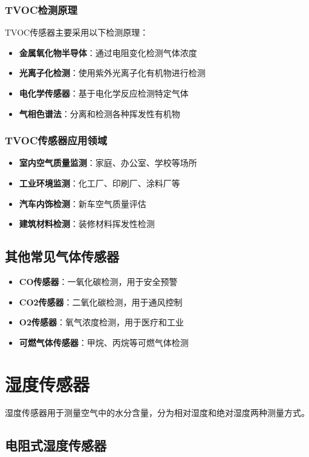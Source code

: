 \documentclass[12pt,UTF8]{ctexbook}
\begin{document}
\subsubsection{TVOC检测原理}
TVOC传感器主要采用以下检测原理：
\begin{itemize}[leftmargin=2cm]
	\item \textbf{金属氧化物半导体}：通过电阻变化检测气体浓度
	\item \textbf{光离子化检测}：使用紫外光离子化有机物进行检测
	\item \textbf{电化学传感器}：基于电化学反应检测特定气体
	\item \textbf{气相色谱法}：分离和检测各种挥发性有机物
\end{itemize}

\subsubsection{TVOC传感器应用领域}
\begin{itemize}[leftmargin=2cm]
	\item \textbf{室内空气质量监测}：家庭、办公室、学校等场所
	\item \textbf{工业环境监测}：化工厂、印刷厂、涂料厂等
	\item \textbf{汽车内饰检测}：新车空气质量评估
	\item \textbf{建筑材料检测}：装修材料挥发性检测
\end{itemize}

\subsection{其他常见气体传感器}
\begin{itemize}[leftmargin=2cm]
	\item \textbf{CO传感器}：一氧化碳检测，用于安全预警
	\item \textbf{CO2传感器}：二氧化碳检测，用于通风控制
	\item \textbf{O2传感器}：氧气浓度检测，用于医疗和工业
	\item \textbf{可燃气体传感器}：甲烷、丙烷等可燃气体检测
\end{itemize}

\section{湿度传感器}

湿度传感器用于测量空气中的水分含量，分为相对湿度和绝对湿度两种测量方式。

\subsection{电阻式湿度传感器}
\end{document}
